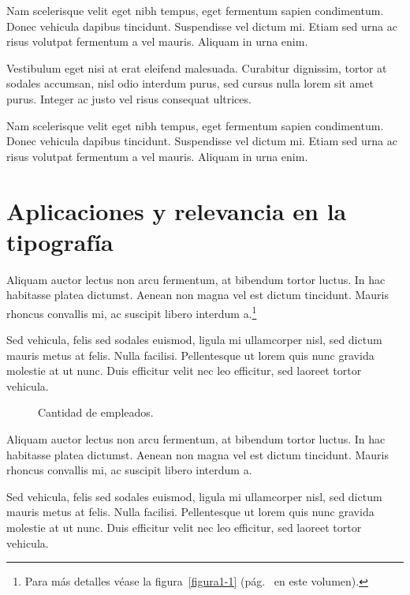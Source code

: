 Nam scelerisque velit eget nibh tempus, eget fermentum sapien condimentum. Donec vehicula dapibus tincidunt. Suspendisse vel dictum mi. Etiam sed urna ac risus volutpat fermentum a vel mauris. Aliquam in urna enim.

Vestibulum eget nisi at erat eleifend malesuada. Curabitur dignissim, tortor at sodales accumsan, nisl odio interdum purus, sed cursus nulla lorem sit amet purus. Integer ac justo vel risus consequat ultrices.

Nam scelerisque velit eget nibh tempus, eget fermentum sapien condimentum. Donec vehicula dapibus tincidunt. Suspendisse vel dictum mi. Etiam sed urna ac risus volutpat fermentum a vel mauris. Aliquam in urna enim.

\section{Aplicaciones y relevancia en la tipografía}

Aliquam auctor lectus non arcu fermentum, at bibendum tortor luctus. In hac habitasse platea dictumst. Aenean non magna vel est dictum tincidunt. Mauris rhoncus convallis mi, ac suscipit libero interdum a.\footnote{Para más detalles véase la figura~\ref{figura1-1} (pág.~\pageref{figura1-1} en este volumen).}

Sed vehicula, felis sed sodales euismod, ligula mi ullamcorper nisl, sed dictum mauris metus at felis. Nulla facilisi. Pellentesque ut lorem quis nunc gravida molestie at ut nunc. Duis efficitur velit nec leo efficitur, sed laoreet tortor vehicula.

\begin{figure}[!ht]
\centering
\begin{bchart}[step=200,max=1000]
	\ifPDF
		\else
		\ifBNPDF
			\else
			\ifPNGEPUB
			\fi
	\fi
\fi
\end{bchart}
\caption{Cantidad de empleados.}
\end{figure}

Aliquam auctor lectus non arcu fermentum, at bibendum tortor luctus. In hac habitasse platea dictumst. Aenean non magna vel est dictum tincidunt. Mauris rhoncus convallis mi, ac suscipit libero interdum a.

Sed vehicula, felis sed sodales euismod, ligula mi ullamcorper nisl, sed dictum mauris metus at felis. Nulla facilisi. Pellentesque ut lorem quis nunc gravida molestie at ut nunc. Duis efficitur velit nec leo efficitur, sed laoreet tortor vehicula.

